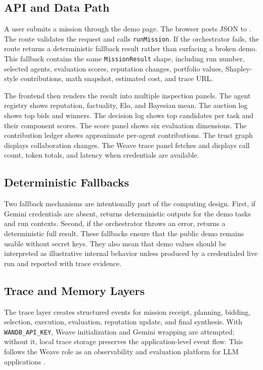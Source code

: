 \subsection{API and Data Path}

A user submits a mission through the demo page. The browser posts JSON to . The route validates the request and calls \texttt{runMission}. If the orchestrator fails, the route returns a deterministic fallback result rather than surfacing a broken demo. This fallback contains the same \texttt{MissionResult} shape, including run number, selected agents, evaluation scores, reputation changes, portfolio values, Shapley-style contributions, math snapshot, estimated cost, and trace URL.

The frontend then renders the result into multiple inspection panels. The agent registry shows reputation, factuality, Elo, and Bayesian mean. The auction log shows top bids and winners. The \marketmaker{} decision log shows top candidates per task and their component scores. The score panel shows six evaluation dimensions. The contribution ledger shows approximate per-agent contributions. The trust graph displays collaboration changes. The Weave trace panel fetches  and displays call count, token totals, and latency when credentials are available.

\subsection{Deterministic Fallbacks}

Two fallback mechanisms are intentionally part of the computing design. First, if Gemini credentials are absent,  returns deterministic outputs for the demo tasks and run contexts. Second, if the orchestrator throws an error,  returns a deterministic full result. These fallbacks ensure that the public demo remains usable without secret keys. They also mean that demo values should be interpreted as illustrative internal behavior unless produced by a credentialed live run and reported with trace evidence.

\subsection{Trace and Memory Layers}

The trace layer creates structured events for mission receipt, planning, bidding, selection, execution, evaluation, reputation update, and final synthesis. With \texttt{WANDB\_API\_KEY}, Weave initialization and Gemini wrapping are attempted; without it, local trace storage preserves the application-level event flow. This follows the Weave role as an observability and evaluation platform for LLM applications \citep{wandbweave2026}.

